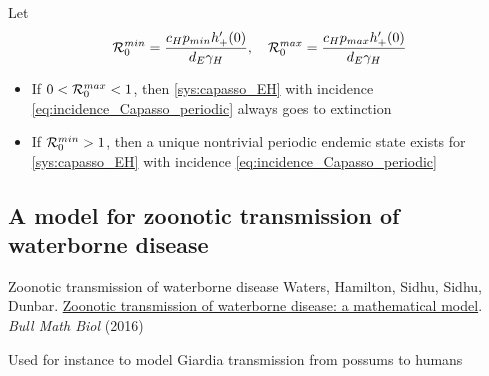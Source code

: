 \documentclass[aspectratio=169]{beamer}
\begin{document}
\begin{frame}
  Let
  \begin{equation}
    \label{eq:R0_capasso_periodic}
    \mathcal{R}_0^{min} = \frac{c_Hp_{min}h'_+(0)}{d_E\gamma_H},\quad 
    \mathcal{R}_0^{max} = \frac{c_Hp_{max}h'_+(0)}{d_E\gamma_H}
  \end{equation}
  \begin{theorem}
    \begin{itemize}
      \item If $0<\mathcal{R}_0^{max}<1$, then \eqref{sys:capasso_EH} with incidence \eqref{eq:incidence_Capasso_periodic} always goes to extinction
      \item If $\mathcal{R}_0^{min}>1$, then a unique nontrivial periodic endemic state exists for \eqref{sys:capasso_EH} with incidence \eqref{eq:incidence_Capasso_periodic}
    \end{itemize}
  \end{theorem}
\end{frame}



\subsection{A model for zoonotic transmission of waterborne disease}

\begin{frame}{Zoonotic transmission of waterborne disease}
  Waters, Hamilton, Sidhu, Sidhu, Dunbar. \href{https://doi-org.uml.idm.oclc.org/10.1007/s11538-015-0136-y}{Zoonotic transmission of waterborne disease: a mathematical model}. 
  \emph{Bull Math Biol}  (2016)

  Used for instance to model Giardia transmission from possums to humans
\end{frame}
\end{document}
